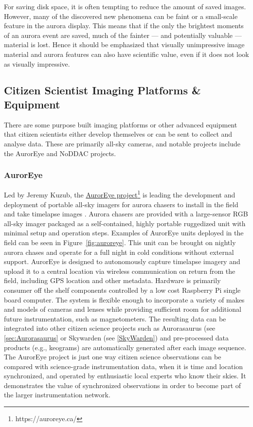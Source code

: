 \documentclass{article}
\renewcommand{\cite}[1]{\parencite{#1}}
\begin{document}
For saving disk space, it is often tempting to reduce the amount of saved images. However, many of the discovered new phenomena can be faint or a small-scale feature in the aurora display. This means that if the only the brightest moments of an aurora event are saved, much of the fainter --- and potentially valuable --- material is lost. Hence it should be emphasized that visually unimpressive image material and aurora features can also have scientific value, even if it does not look as visually impressive.



\subsection{Citizen Scientist Imaging Platforms \& Equipment}
There are some purpose built imaging platforms or other advanced equipment that citizen scientists either develop themselves or can be sent to collect and analyse data. These are primarily all-sky cameras, and notable projects include the AurorEye and NoDDAC projects.

\subsubsection{AurorEye}

Led by Jeremy Kuzub, the \href{https://auroreye.ca/}{AurorEye project}\footnote{https://auroreye.ca/} is leading the development and deployment of portable all-sky imagers for aurora chasers to install in the field and take timelapse images \cite{Kuzub2022}. Aurora chasers are provided with a large-sensor RGB all-sky imager packaged as a self-contained, highly portable ruggedized unit with minimal setup and operation steps. Examples of AurorEye units deployed in the field can be seen in Figure~\ref{fig:auroreye}. This unit can be brought on nightly aurora chases and operate for a full night in cold conditions without external support. AurorEye is designed to autonomously capture timelapse imagery and upload it to a central location via wireless communication on return from the field, including GPS location and other metadata. Hardware is primarily consumer off the shelf components controlled by a low cost Raspberry Pi single board computer. The system is flexible enough to incorporate a variety of makes and models of cameras and lenses while providing sufficient room for additional future instrumentation, such as magnetometers. The resulting data can be integrated into other citizen science projects such as Aurorasaurus (see \ref{sec:Aurorasaurus} or Skywarden (see \ref{SkyWarden}) and pre-processed data products (e.g., keograms) are automatically generated after each image sequence. The AurorEye project is just one way citizen science observations can be compared with science-grade instrumentation data, when it is time and location synchronized, and operated by enthusiastic local experts who know their skies. It demonstrates the value of synchronized observations in order to become part of the larger instrumentation network. 
\end{document}
